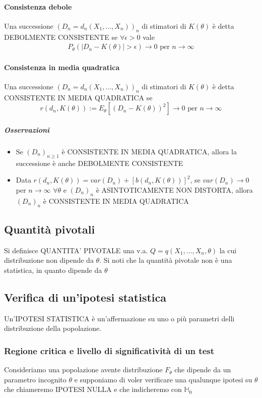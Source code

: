 \documentclass{article}
\begin{document}
	\paragraph{Consistenza debole}
	Una successione $(D_n=d_n(X_1,...,X_n))_n$ di stimatori di $K(\theta)$ è detta DEBOLMENTE CONSISTENTE se $\forall\epsilon>0$ vale
	\begin{align*}
		P_\theta(|D_n-K(\theta)| > \epsilon) \to 0 \text{ per } n \to \infty
	\end{align*}
	\paragraph{Consistenza in media quadratica}
	Una successione $(D_n=d_n(X_1,...,X_n))_n$ di stimatori di $K(\theta)$ è detta CONSISTENTE IN MEDIA QUADRATICA se
	\begin{equation*}
		r(d_n,K(\theta)):=E_\theta[(D_n - K(\theta))^2] \to 0 \text{ per } n \to \infty
	\end{equation*}
	\subparagraph{Osservazioni}
	\begin{itemize}
		\item Se $(D_n)_{n\geq1}$ è CONSISTENTE IN MEDIA QUADRATICA, allora la successione è anche DEBOLMENTE CONSISTENTE
		\item Data $r(d_n,K(\theta)) = var(D_n) + [b(d_n, K(\theta))]^2$, se $var(D_n) \to 0$ per $n \to \infty$ $\forall\theta$ e $(D_n)_n$ è ASINTOTICAMENTE NON DISTORTA, allora $(D_n)_n$ è CONSISTENTE IN MEDIA QUADRATICA
	\end{itemize}

	\subsection{Quantità pivotali}
	Si definisce QUANTITA' PIVOTALE una v.a. $Q=q(X_1,...,X_n,\theta)$ la cui distribuzione non dipende da $\theta$. Si noti che la quantità pivotale non è una statistica, in quanto dipende da $\theta$
	
	\newpage
	\subsection{Verifica di un'ipotesi statistica}
	Un'IPOTESI STATISTICA è un'affermazione su uno o più parametri delli distribuzione della popolazione.
	\subsubsection{Regione critica e livello di significatività di un test}
	Consideriamo una popolazione avente distribuzione $F_\theta$ che dipende da un parametro incognito $\theta$ e supponiamo di voler verificare una qualunque ipotesi su $\theta$ che chiameremo IPOTESI NULLA e che indicheremo con $\mathbb{H}_0$
\end{document}
